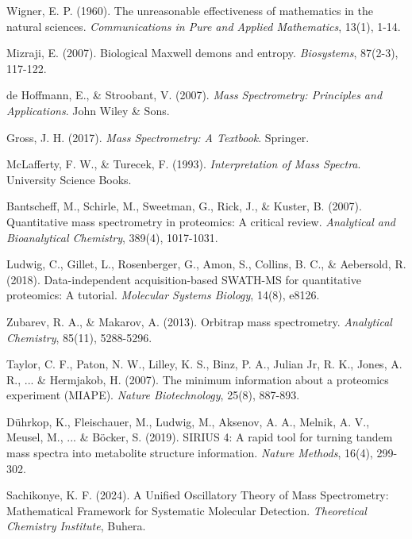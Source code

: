 \documentclass[11pt,a4paper]{article}
\theoremstyle{remark}
\begin{document}

\begin{thebibliography}{99}

Wigner, E. P. (1960). The unreasonable effectiveness of mathematics in the natural sciences. \textit{Communications in Pure and Applied Mathematics}, 13(1), 1-14.

Mizraji, E. (2007). Biological Maxwell demons and entropy. \textit{Biosystems}, 87(2-3), 117-122.

de Hoffmann, E., \& Stroobant, V. (2007). \textit{Mass Spectrometry: Principles and Applications}. John Wiley \& Sons.

Gross, J. H. (2017). \textit{Mass Spectrometry: A Textbook}. Springer.

McLafferty, F. W., \& Turecek, F. (1993). \textit{Interpretation of Mass Spectra}. University Science Books.

Bantscheff, M., Schirle, M., Sweetman, G., Rick, J., \& Kuster, B. (2007). Quantitative mass spectrometry in proteomics: A critical review. \textit{Analytical and Bioanalytical Chemistry}, 389(4), 1017-1031.

Ludwig, C., Gillet, L., Rosenberger, G., Amon, S., Collins, B. C., \& Aebersold, R. (2018). Data-independent acquisition-based SWATH-MS for quantitative proteomics: A tutorial. \textit{Molecular Systems Biology}, 14(8), e8126.

Zubarev, R. A., \& Makarov, A. (2013). Orbitrap mass spectrometry. \textit{Analytical Chemistry}, 85(11), 5288-5296.

Taylor, C. F., Paton, N. W., Lilley, K. S., Binz, P. A., Julian Jr, R. K., Jones, A. R., ... \& Hermjakob, H. (2007). The minimum information about a proteomics experiment (MIAPE). \textit{Nature Biotechnology}, 25(8), 887-893.

Dührkop, K., Fleischauer, M., Ludwig, M., Aksenov, A. A., Melnik, A. V., Meusel, M., ... \& Böcker, S. (2019). SIRIUS 4: A rapid tool for turning tandem mass spectra into metabolite structure information. \textit{Nature Methods}, 16(4), 299-302.

Sachikonye, K. F. (2024). A Unified Oscillatory Theory of Mass Spectrometry: Mathematical Framework for Systematic Molecular Detection. \textit{Theoretical Chemistry Institute}, Buhera.


\end{thebibliography}
\end{document}
